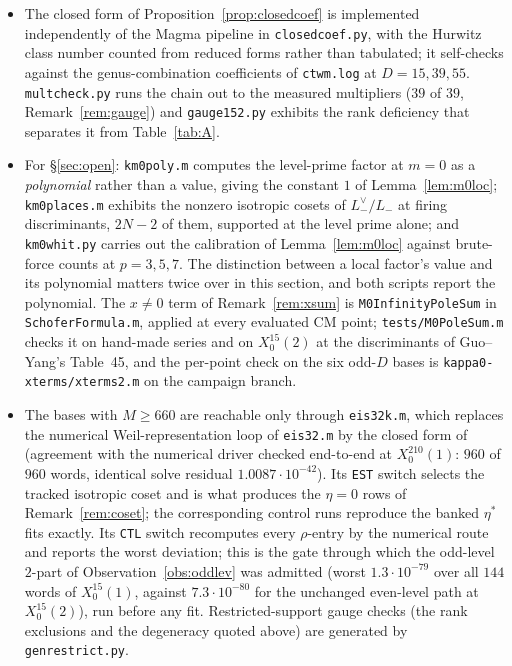 \documentclass[11pt,reqno]{amsart}
\theoremstyle{plain}
\theoremstyle{definition}
\begin{document}
\begin{itemize}
      (\texttt{mono}/\texttt{epool}/\texttt{eis32e}/\texttt{kernelrat}/\texttt{eisrat}/%
      \texttt{allgross} per base), and the composite-$s$ preregistration
      (\texttt{thetasum-form.md}, \texttt{mass210.log}).
\item The closed form of Proposition~\ref{prop:closedcoef} is implemented independently of
      the Magma pipeline in \texttt{closedcoef.py}, with the Hurwitz class number counted from
      reduced forms rather than tabulated; it self-checks against the genus-combination
      coefficients of \texttt{ctwm.log} at $D=15,39,55$. \texttt{multcheck.py} runs the chain
      out to the measured multipliers ($39$ of $39$, Remark~\ref{rem:gauge}) and
      \texttt{gauge152.py} exhibits the rank deficiency that separates it from
      Table~\ref{tab:A}.
\item For \S\ref{sec:open}: \texttt{km0poly.m} computes the level-prime factor at $m=0$ as a
      \emph{polynomial} rather than a value, giving the constant $1$ of Lemma~\ref{lem:m0loc};
      \texttt{km0places.m} exhibits the nonzero isotropic cosets of $L_-^\vee/L_-$ at firing
      discriminants, $2N-2$ of them, supported at the level prime alone; and \texttt{km0whit.py}
      carries out the calibration of Lemma~\ref{lem:m0loc} against brute-force counts at
      $p=3,5,7$. The distinction between a local factor's value and its polynomial matters twice
      over in this section, and both scripts report the polynomial. The $x\neq0$ term of
      Remark~\ref{rem:xsum} is \texttt{M0InfinityPoleSum} in \texttt{SchoferFormula.m}, applied
      at every evaluated CM point; \texttt{tests/M0PoleSum.m} checks it on hand-made series and
      on $X_0^{15}(2)$ at the discriminants of Guo--Yang's Table~45, and the per-point check on
      the six odd-$D$ bases is \texttt{kappa0-xterms/xterms2.m} on the campaign branch.
\item The bases with $M\ge660$ are reachable only through \texttt{eis32k.m}, which replaces
      the numerical Weil-representation loop of \texttt{eis32.m} by the closed form of
      \cite[Thm.~6.4]{Stromberg2013} (agreement with the numerical driver checked
      end-to-end at $X_0^{210}(1)$: $960$ of $960$ words, identical solve residual
      $1.0087\cdot10^{-42}$). Its \texttt{EST} switch selects the tracked isotropic coset
      and is what produces the $\eta=0$ rows of Remark~\ref{rem:coset}; the corresponding
      control runs reproduce the banked $\eta^*$ fits exactly. Its \texttt{CTL} switch
      recomputes every $\rho$-entry by the numerical route and reports the worst
      deviation; this is the gate through which the odd-level $2$-part of
      Observation~\ref{obs:oddlev} was admitted (worst $1.3\cdot10^{-79}$ over all $144$
      words of $X_0^{15}(1)$, against $7.3\cdot10^{-80}$ for the unchanged even-level path
      at $X_0^{15}(2)$), run before any fit. Restricted-support gauge checks (the rank
      exclusions and the degeneracy quoted above) are generated by \texttt{genrestrict.py}.
\end{itemize}
\end{document}
